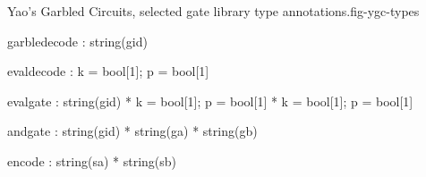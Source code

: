 \begin{fpfig}[t]{Yao's Garbled Circuits, selected gate library type annotations.}{fig-ygc-types}
{\footnotesize
\begin{verbatimtab}
  garbledecode : string(gid)
  
  evaldecode   : { k = bool[1]; p = bool[1] }
  
  evalgate     : string(gid) *  { k = bool[1]; p = bool[1] } * { k = bool[1]; p = bool[1] }
  
  andgate      : string(gid) * string(ga) * string(gb) 

  encode       : string(sa) * string(sb)
\end{verbatimtab}
}
\end{fpfig}

  
%    
